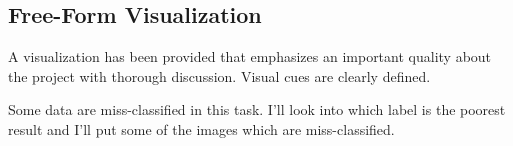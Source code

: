 \subsection{Free-Form Visualization}
A visualization has been provided that emphasizes an important quality about the project with thorough discussion. Visual cues are clearly defined.

Some data are miss-classified in this task. I'll look into which label is the poorest result and I'll put some of the images which are miss-classified.

